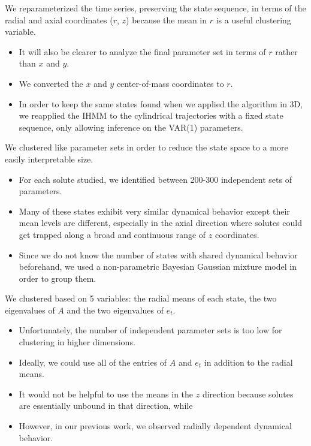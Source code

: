 \documentclass{article}
\begin{document}
  We reparameterized the time series, preserving the state sequence, in terms
  of the radial and axial coordinates ($r$, $z$) because the mean in $r$ is 
  a useful clustering variable.
  \begin{itemize}
    \item It will also be clearer to analyze the final parameter set in
    terms of $r$ rather than $x$ and $y$.
    \item We converted the $x$ and $y$ center-of-mass coordinates to $r$.
    \item In order to keep the same states found when we applied the algorithm
    in 3D, we reapplied the IHMM to the cylindrical trajectories with a fixed 
    state sequence, only allowing inference on the VAR(1) parameters. 
  \end{itemize} 
  
  We clustered like parameter sets in order to reduce the state space to
  a more easily interpretable size.
  \begin{itemize}
   \item For each solute studied, we identified between 200-300 independent sets of
   parameters. %
   \item Many of these states exhibit very similar dynamical behavior except their
   mean levels are different, especially in the axial direction where solutes could
   get trapped along a broad and continuous range of $z$ coordinates.
   \item Since we do not know the number of states with shared dynamical behavior
   beforehand, we used a non-parametric Bayesian Gaussian mixture model in order
   to group them. %
  \end{itemize}   
 
  We clustered based on 5 variables: the radial means of each state, the two
  eigenvalues of $A$ and the two eigenvalues of $e_t$.
  \begin{itemize}
   \item Unfortunately, the number of independent parameter sets is too low for
   clustering in higher dimensions. 
   \item Ideally, we could use all of the entries of $A$ and $e_t$ in addition to 
   the radial means.
   \item It would not be helpful to use the means in the $z$ direction because solutes
   are essentially unbound in that direction, while 
   \item However, in our previous work, we observed radially dependent dynamical 
   behavior.~\cite{coscia_chemically_2019}  %
  \end{itemize}
\end{document}

